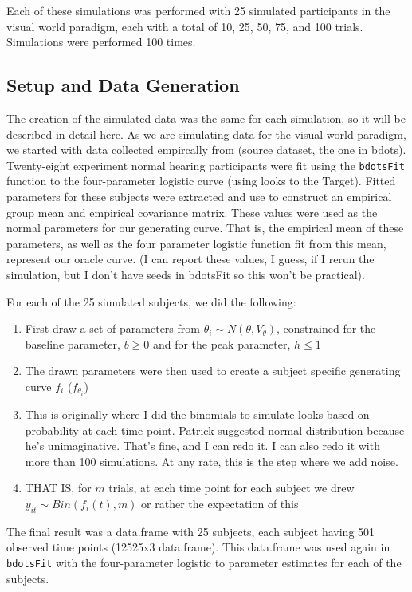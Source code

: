 \documentclass{article}
\begin{document}
Each of these simulations was performed with 25 simulated participants in the visual world paradigm, each with a total of 10, 25, 50, 75, and 100 trials. Simulations were performed 100 times. 

\subsection{Setup and Data Generation}

The creation of the simulated data was the same for each simulation, so it will be described in detail here. As we are simulating data for the visual world paradigm, we started with data collected empircally from (source dataset, the one in bdots). Twenty-eight experiment normal hearing participants were fit using the \texttt{bdotsFit} function to the four-parameter logistic curve (using looks to the Target). Fitted parameters for these subjects were extracted and use to construct an empirical group mean and empirical covariance matrix. These values were used as the normal parameters for our generating curve. That is, the empirical mean of these parameters, as well as the four parameter logistic function fit from this mean, represent our oracle curve. (I can report these values, I guess, if I rerun the simulation, but I don't have seeds in bdotsFit so this won't be practical).

For each of the 25 simulated subjects, we did the following:

\begin{enumerate}
	\item First draw a set of parameters from $\theta_i \sim N(\theta, V_{\theta})$, constrained for the baseline parameter, $b \geq 0$ and for the peak parameter, $h \leq 1$
	\item The drawn parameters were then used to create a subject specific generating curve $f_i$ ($f_{\theta_i}$)
	\item This is originally where I did the binomials to simulate looks based on probability at each time point. Patrick suggested normal distribution because he's unimaginative. That's fine, and I can redo it. I can also redo it with more than 100 simulations. At any rate, this is the step where we add noise. 
	\item THAT IS, for $m$ trials, at each time point for each subject we drew $y_{it} \sim Bin(f_i(t), m)$ or rather the expectation of this
\end{enumerate}


The final result was a data.frame with 25 subjects, each subject having 501 observed time points (12525x3 data.frame). This data.frame was used again in \texttt{bdotsFit} with the four-parameter logistic to parameter estimates for each of the subjects.
\end{document}
